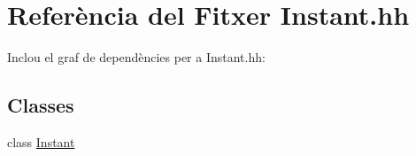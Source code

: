 \hypertarget{_instant_8hh}{\section{Referència del Fitxer Instant.\-hh}
\label{_instant_8hh}
}
Inclou el graf de dependències per a Instant.\-hh\-:
\subsection*{Classes}
\begin{DoxyCompactItemize}
\item 
class \hyperlink{class_instant}{Instant}
\end{DoxyCompactItemize}
